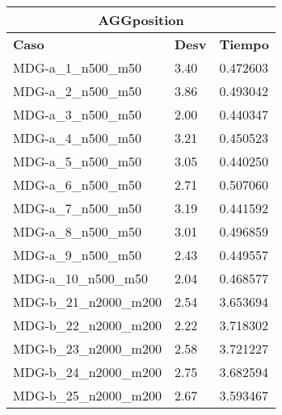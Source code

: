 \documentclass[10pt,a4paper]{article}
\begin{document}
\begin{table}[]
	\centering
	\begin{tabular}{|l|l|l|}
		\hline
		\multicolumn{3}{|c|}{\textbf{AGGposition}}                                                         \\ \hline
		\textbf{Caso}          & \multicolumn{1}{c|}{\textbf{Desv}} & \multicolumn{1}{c|}{\textbf{Tiempo}} \\ \hline
		MDG-a\_1\_n500\_m50    & 3.40                               & 0.472603                             \\ \hline
		MDG-a\_2\_n500\_m50    & 3.86                               & 0.493042                             \\ \hline
		MDG-a\_3\_n500\_m50    & 2.00                               & 0.440347                             \\ \hline
		MDG-a\_4\_n500\_m50    & 3.21                               & 0.450523                             \\ \hline
		MDG-a\_5\_n500\_m50    & 3.05                               & 0.440250                             \\ \hline
		MDG-a\_6\_n500\_m50    & 2.71                               & 0.507060                             \\ \hline
		MDG-a\_7\_n500\_m50    & 3.19                               & 0.441592                             \\ \hline
		MDG-a\_8\_n500\_m50    & 3.01                               & 0.496859                             \\ \hline
		MDG-a\_9\_n500\_m50    & 2.43                               & 0.449557                             \\ \hline
		MDG-a\_10\_n500\_m50   & 2.04                               & 0.468577                             \\ \hline
		MDG-b\_21\_n2000\_m200 & 2.54                               & 3.653694                             \\ \hline
		MDG-b\_22\_n2000\_m200 & 2.22                               & 3.718302                             \\ \hline
		MDG-b\_23\_n2000\_m200 & 2.58                               & 3.721227                             \\ \hline
		MDG-b\_24\_n2000\_m200 & 2.75                               & 3.682594                             \\ \hline
		MDG-b\_25\_n2000\_m200 & 2.67                               & 3.593467                             \\ \hline

\end{tabular}
\end{table}
\end{document}
